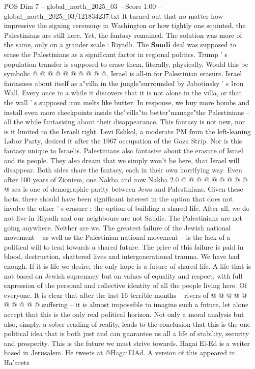 \begin{textsample}{POS Dim 7 – global\_north\_2025\_03 – Score 1.00 – global\_north\_2025\_03/121834237.txt}
It turned out that no matter how impressive the signing ceremony in Washington or how tightly one squinted, the Palestinians are still here.
Yet, the fantasy remained.
The solution was more of the same, only on a grander scale : Riyadh.
The \textbf{Saudi} deal was supposed to erase the Palestinians as a significant factor in regional politics.
Trump ' s population transfer is supposed to erase them, literally, physically.
Would this be symbolic @ @ @ @ @ @ @ @ @ @, Israel is all-in for Palestinian erasure.
Israel fantasises about itself as a"villa in the jungle"surrounded by Jabotinsky ' s Iron Wall.
Every once in a while it discovers that it is not alone in the villa, or that the wall ' s supposed iron melts like butter.
In response, we buy more bombs and install even more checkpoints inside the"villa"to better"manage"the Palestinians -- all the while fantasising about their disappearance.
This fantasy is not new, nor is it limited to the Israeli right.
Levi Eshkol, a moderate PM from the left-leaning Labor Party, desired it after the 1967 occupation of the Gaza Strip.
Nor is this fantasy unique to Israelis.
Palestinians also fantasise about the erasure of Israel and its people.
They also dream that we simply won't be here, that Israel will disappear.
Both sides share the fantasy, each in their own horrifying way.
Even after 100 years of Zionism, one Nakba and now Nakba 2.0 @ @ @ @ @ @ @ @ @ @ sea is one of demographic parity between Jews and Palestinians.
Given these facts, there should have been significant interest in the option that does not involve the other ' s erasure : the option of building a shared life.
After all, we do not live in Riyadh and our neighbours are not Saudis.
The Palestinians are not going anywhere.
Neither are we.
The greatest failure of the Jewish national movement -- as well as the Palestinian national movement -- is the lack of a political will to lead towards a shared future.
The price of this failure is paid in blood, destruction, shattered lives and intergenerational trauma.
We have had enough.
If it is life we desire, the only hope is a future of shared life.
A life that is not based on Jewish supremacy but on values of equality and respect, with full expression of the personal and collective identity of all the people living here.
Of everyone.
It is clear that after the last 16 terrible months -- rivers of @ @ @ @ @ @ @ @ @ @ suffering -- it is almost impossible to imagine such a future, let alone accept that this is the only real political horizon.
Not only a moral analysis but also, simply, a sober reading of reality, leads to the conclusion that this is the one political idea that is both just and can guarantee us all a life of stability, security and prosperity.
This is the future we must strive towards.
Hagai El-Ed is a writer based in Jerusalem.
He tweets at @HagaiElAd.
A version of this appeared in Ha'aretz

\end{textsample}
